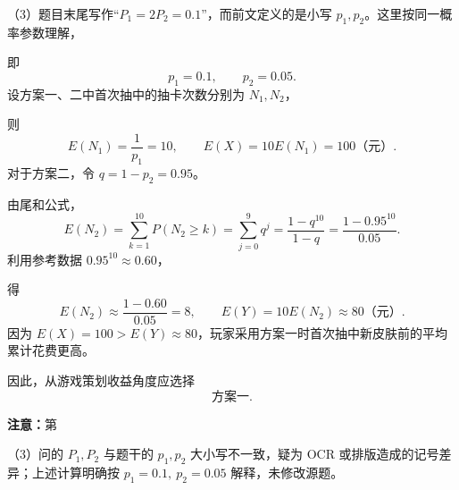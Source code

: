 \documentclass[UTF8,11pt,a4paper]{ctexart}
\begin{document}
\par\smallskip\noindent（3）题目末尾写作``\(P_1=2P_2=0.1\)''，而前文定义的是小写 \(p_1,p_2\)。这里按同一概率参数理解，

即
\[
   p_1=0.1,\qquad p_2=0.05.
   \]
设方案一、二中首次抽中的抽卡次数分别为 \(N_1,N_2\)，

则
\[
   E(N_1)=\frac1{p_1}=10,
   \qquad
   E(X)=10E(N_1)=100\text{（元）}.
   \]
对于方案二，令 \(q=1-p_2=0.95\)。

由尾和公式，
\[
   E(N_2)
   =\sum_{k=1}^{10}P(N_2\ge k)
   =\sum_{j=0}^{9}q^j
   =\dfrac{1-q^{10}}{1-q}
   =\dfrac{1-0.95^{10}}{0.05}.
   \]
利用参考数据 \(0.95^{10}\approx0.60\)，

得
\[
   E(N_2)\approx\dfrac{1-0.60}{0.05}=8,
   \qquad
   E(Y)=10E(N_2)\approx80\text{（元）}.
   \]
因为 \(E(X)=100>E(Y)\approx80\)，玩家采用方案一时首次抽中新皮肤前的平均累计花费更高。

因此，从游戏策划收益角度应选择
\[
   \boxed{\text{方案一}}.
   \]

\textbf{注意：}第
\par\smallskip\noindent（3）问的 \(P_1,P_2\) 与题干的 \(p_1,p_2\) 大小写不一致，疑为 OCR 或排版造成的记号差异；上述计算明确按 \(p_1=0.1,\ p_2=0.05\) 解释，未修改源题。
\end{document}
